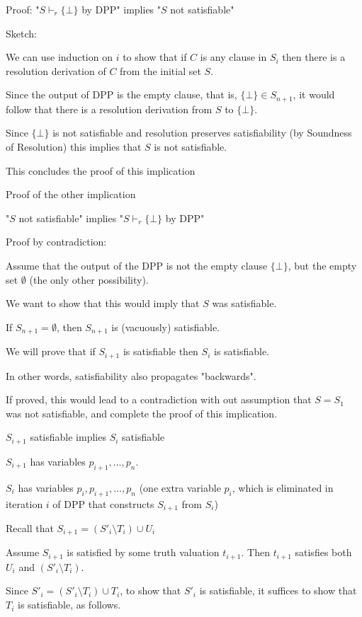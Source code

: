 \documentclass{article}
\begin{document}
Proof: "$S \vdash_r \{\bot\}$ by DPP" implies "$S$ not satisfiable"

Sketch:

We can use induction on $i$ to show that if $C$ is any clause in $S_i$ then there is a resolution derivation of $C$ from the initial set $S$.

Since the output of DPP is the empty clause, that is, $\{\bot\} \in S_{n+1}$, it would follow that there is a resolution derivation from $S$ to $\{\bot\}$.

Since $\{\bot\}$ is not satisfiable and resolution preserves satisfiability (by Soundness of Resolution) this implies that $S$ is not satisfiable.

This concludes the proof of this implication

Proof of the other implication

"$S$ not satisfiable" implies "$S \vdash_r \{\bot\}$ by DPP"

Proof by contradiction:

Assume that the output of the DPP is not the empty clause $\{\bot\}$, but the empty set $\emptyset$ (the only other possibility).

We want to show that this would imply that $S$ was satisfiable.

If $S_{n+1} = \emptyset$, then $S_{n+1}$ is (vacuously) satisfiable.

We will prove that if $S_{i+1}$ is satisfiable then $S_i$ is satisfiable.

In other words, satisfiability also propagates "backwards".

If proved, this would lead to a contradiction with out assumption that $S = S_1$ was not satisfiable, and complete the proof of this implication.

$S_{i+1}$ satisfiable implies $S_i$ satisfiable

$S_{i+1}$ has variables $p_{i+1},\ldots,p_n$.

$S_i$ has variables $p_i,p_{i+1},\ldots,p_n$ (one extra variable $p_i$, which is eliminated in iteration $i$ of DPP that constructs $S_{i+1}$ from $S_i$)

Recall that $S_{i+1} = (S'_i \setminus T_i) \cup U_i$

Assume $S_{i+1}$ is satisfied by some truth valuation $t_{i+1}$. Then $t_{i+1}$ satisfies both $U_i$ and $(S'_i \setminus T_i)$.

Since $S'_i = (S'_i \setminus T_i) \cup T_i$, to show that $S'_i$ is satisfiable, it suffices to show that $T_i$ is satisfiable, as follows.
\end{document}
